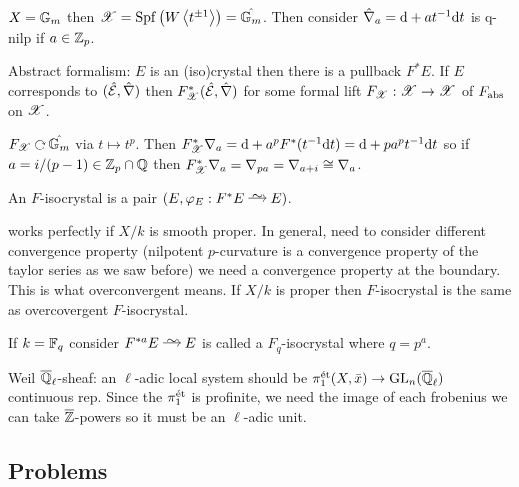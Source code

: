 \documentclass[12pt]{article}
\newcommand{\Spf}[1]{\mathrm{Spf}\left( #1 \right)}
\begin{document}
\begin{example}
$X = \mathbb{G}_m$ then $\X = \Spf{W\left< t^{\pm 1} \right>} = \hat{\Gm}$. Then consider $\hat{\nabla}_a = \mathrm{d} + a t^{-1} \mathrm{d}{t}$ is q-nilp if $a \in \mathbb{Z}_p$. 
\end{example}

Abstract formalism: $E$ is an (iso)crystal then there is a pullback $F^* E$. If $E$ corresponds to $(\hat{\mathcal{E}}, \hat{\nabla})$ then $F^*_{\mathscr{X}} (\hat{\mathcal{E}}, \hat{\nabla})$ for some formal lift $F_{\mathscr{X}} : \mathscr{X} \to \mathscr{X}$ of $F_{\mathrm{abs}}$ on $\mathscr{X}$.

\begin{example}
$F_{\X} \acts \hat{\Gm}$ via $t \mapsto t^p$. Then $F^*_{\mathscr{X}} \nabla_a = \mathrm{d} + a^p F^* (t^{-1} \mathrm{d}{t}) =  \mathrm{d} + p a^p t^{-1} \mathrm{d}{t}$ so if $a = i / (p-1) \in \mathbb{Z}_p \cap \mathbb{Q}$ then $F^*_{\mathscr{X}} \nabla_a = \nabla_{pa} = \nabla_{a + i} \cong \nabla_a$. 
\end{example} 

\begin{defn}
An $F$-isocrystal is a pair $(E, \varphi_E : F^* E \iso E)$. 
\end{defn}

\begin{rmk}
works perfectly if $X / k$ is smooth proper. In general, need to consider different convergence property (nilpotent $p$-curvature is a convergence property of the taylor series as we saw before) we need a convergence property at the boundary. This is what overconvergent means. If $X / k$ is proper then $F$-isocrystal is the same as overcovergent $F$-isocrystal. 
\end{rmk}

\begin{rmk}
If $k = \mathbb{F}_q$ consider $F^{*a} E \iso E$ is called a $F_q$-isocrystal where $q = p^a$. 
\end{rmk}

Weil $\overline{\mathbb{Q}}_{\ell}$-sheaf: an $\ell$-adic local system should be $\pi_1^{\text{\'{e}t}}(X, \bar{x}) \to \mathrm{GL}_n(\overline{\mathbb{Q}}_\ell)$ continuous rep. Since the $\pi_1^{\text{\'{e}t}}$ is profinite, we need the image of each frobenius we can take $\overline{\mathbb{Z}}$-powers so it must be an $\ell$-adic unit. 

\subsection{Problems}
\end{document}
